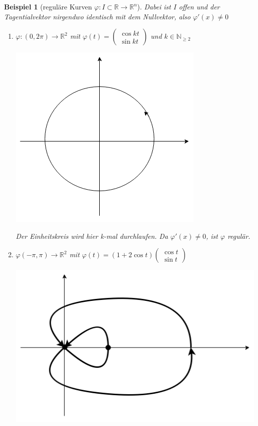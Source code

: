 \documentclass[a4paper,12pt,portrait]{book}
\theoremstyle{theoremstyle}
\newtheorem{beispiel}[theo]{Beispiel}
\begin{document}
\begin{beispiel}[reguläre Kurven $\varphi:I\subset\mathbb{R}\rightarrow\mathbb{R}^n$]
Dabei ist $I$ offen und der Tagentialvektor nirgendwo identisch mit dem Nullvektor, also $\varphi'(x)\neq 0$

\begin{enumerate}
    \item $\varphi:(0,2\pi)\rightarrow\mathbb{R}^2$ mit $\varphi(t)=\begin{pmatrix}
        \cos kt \\ \sin kt
    \end{pmatrix}$ und $k\in\mathbb{N}_{\geq 2}$\\

\begin{center}\includegraphics[scale=0.3]{pictures/MA2_0002}\\ \end{center}

Der Einheitskreis wird hier k-mal durchlaufen. Da $\varphi'(x)\neq 0$, ist $\varphi$ regulär.
    \item $\varphi(-\pi,\pi)\rightarrow\mathbb{R}^2$ mit $\varphi(t)=(1+2\cos t)\begin{pmatrix}
        \cos t \\ \sin t
\end{pmatrix}$\\

    \begin{center}
    \includegraphics[scale=0.3]{pictures/MA2_0003}\\
    \end{center}


\end{enumerate}
\end{beispiel}
\end{document}
